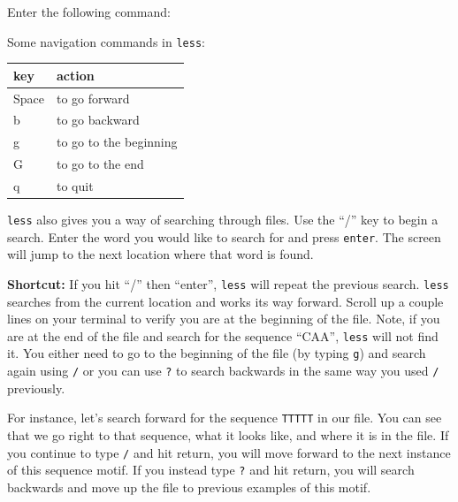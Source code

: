 \documentclass[
  letterpaper,
  DIV=11,
  numbers=noendperiod]{scrreprt}
\newenvironment{Shaded}{\begin{snugshade}}{\end{snugshade}}
\newcommand{\ExtensionTok}[1]{\textcolor[rgb]{0.00,0.23,0.31}{#1}}
\newcommand{\NormalTok}[1]{\textcolor[rgb]{0.00,0.23,0.31}{#1}}
\begin{document}
Enter the following command:

\begin{Shaded}
\end{Shaded}

Some navigation commands in \texttt{less}:

\begin{longtable}[]{@{}ll@{}}
\toprule\noalign{}
key & action \\
\midrule\noalign{}
\endhead
\bottomrule\noalign{}
\endlastfoot
Space & to go forward \\
b & to go backward \\
g & to go to the beginning \\
G & to go to the end \\
q & to quit \\
\end{longtable}

\texttt{less} also gives you a way of searching through files. Use the
``/'' key to begin a search. Enter the word you would like to search for
and press \texttt{enter}. The screen will jump to the next location
where that word is found.

\begin{tcolorbox}[enhanced jigsaw, opacitybacktitle=0.6, colback=white, coltitle=black, opacityback=0, rightrule=.15mm, toptitle=1mm, toprule=.15mm, bottomtitle=1mm, colframe=quarto-callout-tip-color-frame, arc=.35mm, titlerule=0mm, colbacktitle=quarto-callout-tip-color!10!white, leftrule=.75mm, title=\textcolor{quarto-callout-tip-color}{\faLightbulb}\hspace{0.5em}{Shortcut}, breakable, bottomrule=.15mm, left=2mm]

\textbf{Shortcut:} If you hit ``/'' then ``enter'', \texttt{less} will
repeat the previous search. \texttt{less} searches from the current
location and works its way forward. Scroll up a couple lines on your
terminal to verify you are at the beginning of the file. Note, if you
are at the end of the file and search for the sequence ``CAA'',
\texttt{less} will not find it. You either need to go to the beginning
of the file (by typing \texttt{g}) and search again using \texttt{/} or
you can use \texttt{?} to search backwards in the same way you used
\texttt{/} previously.

For instance, let's search forward for the sequence \texttt{TTTTT} in
our file. You can see that we go right to that sequence, what it looks
like, and where it is in the file. If you continue to type \texttt{/}
and hit return, you will move forward to the next instance of this
sequence motif. If you instead type \texttt{?} and hit return, you will
search backwards and move up the file to previous examples of this
motif.

\end{tcolorbox}
\end{document}
